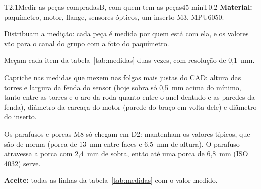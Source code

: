 \documentclass[11pt,a4paper]{article}
\begin{document}
\begin{tarefa}[critica]{T2.1}{Medir as peças compradas}{B, com quem tem as peças}{45 min}{T0.2}
\textbf{Material:} paquímetro, motor, flange, sensores ópticos, um inserto M3, MPU6050.
\begin{passos}
  \item Distribuam a medição: cada peça é medida por quem está com ela, e os valores vão para
    o canal do grupo com a foto do paquímetro.
  \item Meçam cada item da tabela~\ref{tab:medidas} duas vezes, com resolução de 0,1~mm.
  \item Capriche nas medidas que mexem nas folgas mais justas do CAD: altura das torres e
    largura da fenda do sensor (hoje sobra só 0,5~mm acima do mínimo, tanto entre as torres e
    o aro da roda quanto entre o anel dentado e as paredes da fenda), diâmetro da carcaça do
    motor (parede do braço em volta dele) e diâmetro do inserto.
  \item Os parafusos e porcas M8 só chegam em D2: mantenham os valores típicos, que são de
    norma (porca de 13~mm entre faces e 6,5~mm de altura). O parafuso atravessa a porca com
    2,4~mm de sobra, então até uma porca de 6,8~mm (ISO 4032) serve.
\end{passos}
\textbf{Aceite:} todas as linhas da tabela~\ref{tab:medidas} com o valor medido.
\end{tarefa}
\end{document}
